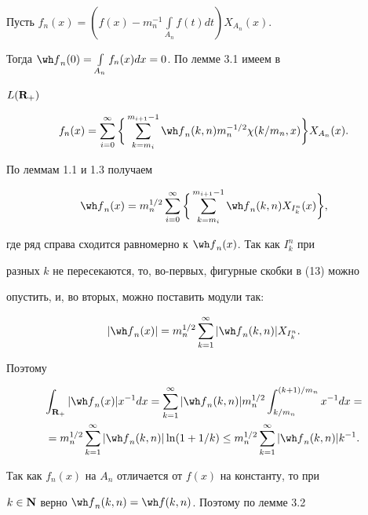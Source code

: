 \begin{pf}


Пусть $f_n(x)=(f(x)-m_n^{-1}\int\limits_{A_n}f(t)dt)X_{A_n}(x)$. 


Тогда ${\wh f}_n(0)=\int\limits_{A_n}f_n(x)dx=0$. По лемме 3.1 имеем в


$L({\bold R}_+)$


$$


f_n(x)=\sum^{\infty}_{i=0}


\bigg\{\sum_{k=m_i}^{m_{i+1}-1}{\wh f}_n(k,n)m_n^{-1/2}


\chi(k/m_n,x)\bigg\}X_{A_n}(x).


$$


По леммам 1.1 и 1.3 получаем 


\begin{equation}


{\wh f}_n(x)=m_n^{1/2}\sum^{\infty}_{i=0}


\bigg\{\sum_{k=m_i}^{m_{i+1}-1}{\wh f}_n(k,n)X_{I^n_k}(x)\bigg\},


\end{equation}


где ряд справа сходится равномерно к ${\wh f}_n(x)$. Так как $I^n_k$ при 


разных $k$ не пересекаются, то, во-первых, фигурные скобки в (13) можно 


опустить, и, во вторых, можно поставить модули так:


$$


|{\wh f}_n(x)|=m_n^{1/2}\sum^{\infty}_{k=1}|{\wh f}_n(k,n)|X_{I^n_k}.


$$


Поэтому 


\begin{multline*}


\int_{{\bold R}_+}|{\wh f}_n(x)|x^{-1}dx=


\sum^{\infty}_{k=1}|{\wh f}_n(k,n)|m_n^{1/2}


\int_{k/m_n}^{(k+1)/m_n}x^{-1}dx=\\


%


=m_n^{1/2}\sum^{\infty}_{k=1}|{\wh f}_n(k,n)|\ln(1+1/k)\leq


m_n^{1/2}\sum^{\infty}_{k=1}|{\wh f}_n(k,n)|k^{-1}.


\end{multline*}


Так как $f_n(x)$ на $A_n$ отличается от $f(x)$ на константу, то при


$k\in \bold N$ верно ${\wh f}_n(k,n)={\wh f}(k,n)$. Поэтому по лемме 3.2



\end{pf}

